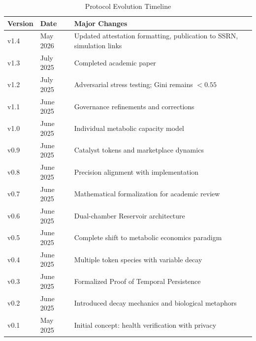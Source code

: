 \documentclass[11pt,letterpaper]{article}
\begin{document}
\begin{table}[H]
\centering
\caption{Protocol Evolution Timeline}
\begin{tabular}{lll}
\toprule
\textbf{Version} & \textbf{Date} & \textbf{Major Changes} \\
\midrule
v1.4 & May 2026 & Updated attestation formatting, publication to SSRN, simulation links \\
v1.3 & July 2025 & Completed academic paper \\
v1.2 & July 2025 & Adversarial stress testing; Gini remains $<0.55$ \\
v1.1 & June 2025 & Governance refinements and corrections \\
v1.0 & June 2025 & Individual metabolic capacity model \\
v0.9 & June 2025 & Catalyst tokens and marketplace dynamics \\
v0.8 & June 2025 & Precision alignment with implementation \\
v0.7 & June 2025 & Mathematical formalization for academic review \\
v0.6 & June 2025 & Dual-chamber Reservoir architecture \\
v0.5 & June 2025 & Complete shift to metabolic economics paradigm \\
v0.4 & June 2025 & Multiple token species with variable decay \\
v0.3 & June 2025 & Formalized Proof of Temporal Persistence \\
v0.2 & June 2025 & Introduced decay mechanics and biological metaphors \\
v0.1 & May 2025 & Initial concept: health verification with privacy \\

\bottomrule
\end{tabular}
\end{table}
\end{document}
